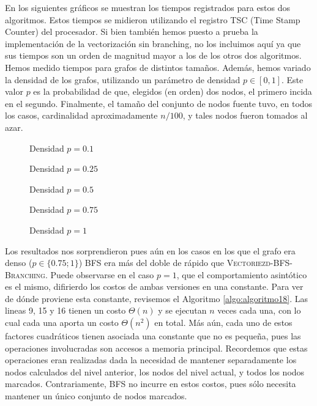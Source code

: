 En los siguientes gráficos se muestran los tiempos registrados para estos dos algoritmos. Estos tiempos se midieron utilizando el registro TSC (Time Stamp Counter) del procesador. Si bien también hemos puesto a prueba la implementación de la vectorización sin branching, no los incluimos aquí ya que sus tiempos son un orden de magnitud mayor a los de los otros dos algoritmos. Hemos medido tiempos para grafos de distintos tamaños. Además, hemos variado la densidad de los grafos, utilizando un parámetro de densidad $p \in [0, 1]$. Este valor $p$ es la probabilidad de que, elegidos (en orden) dos nodos, el primero incida en el segundo. Finalmente, el tamaño del conjunto de nodos fuente tuvo, en todos los casos, cardinalidad aproximadamente $n / 100$, y tales nodos fueron tomados al azar.

\begin{figure}[H]
\centering

\caption{Densidad $p = 0.1$}
\end{figure}

\begin{figure}[H]
\centering

\caption{Densidad $p = 0.25$}
\end{figure}

\begin{figure}[H]
\centering

\caption{Densidad $p = 0.5$}
\end{figure}

\begin{figure}[H]
\centering

\caption{Densidad $p = 0.75$}
\end{figure}

\begin{figure}[H]
\centering

\caption{Densidad $p = 1$}
\end{figure}

Los resultados nos sorprendieron pues aún en los casos en los que el grafo era denso ($p \in \{0.75; 1\}$) \textsc{BFS} era más del doble de rápido que \textsc{Vectoriezd-BFS-Branching}. Puede observarse en el caso $p = 1$, que el comportamiento asintótico es el mismo, difirierdo los costos de ambas versiones en una constante. Para ver de dónde proviene esta constante, revisemos el Algoritmo \ref{algo:algoritmo18}. Las lineas 9, 15 y 16 tienen un costo $\Theta(n)$ y se ejecutan $n$ veces cada una, con lo cual cada una aporta un costo $\Theta(n^2)$ en total. Más aún, cada uno de estos factores cuadráticos tienen asociada una constante que no es pequeña, pues las operaciones involucradas son accesos a memoria principal. Recordemos que estas operaciones eran realizadas dada la necesidad de mantener separadamente los nodos calculados del nivel anterior, los nodos del nivel actual, y todos los nodos marcados. Contrariamente, \textsc{BFS} no incurre en estos costos, pues sólo necesita mantener un único conjunto de nodos marcados.
